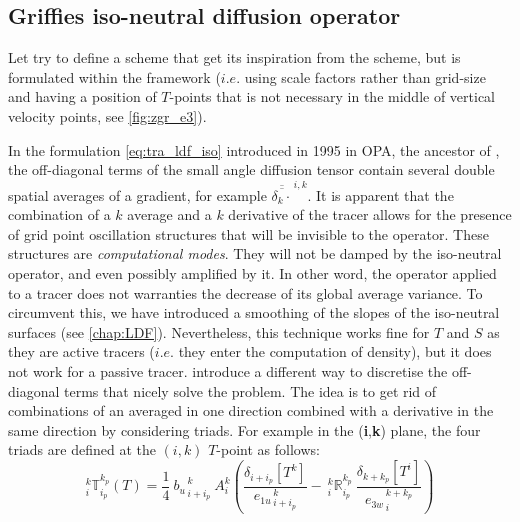 \documentclass[../tex_main/NEMO_manual]{subfiles}
\begin{document}
\subsection{Griffies iso-neutral diffusion operator}

Let try to define a scheme that get its inspiration from the \citet{Griffies_al_JPO98} scheme,
but is formulated within the \NEMO framework
($i.e.$ using scale factors rather than grid-size and having a position of $T$-points that
is not necessary in the middle of vertical velocity points, see \autoref{fig:zgr_e3}).

In the formulation \autoref{eq:tra_ldf_iso} introduced in 1995 in OPA, the ancestor of \NEMO,
the off-diagonal terms of the small angle diffusion tensor contain several double spatial averages of a gradient,
for example $\overline{\overline{\delta_k \cdot}}^{\,i,k}$.
It is apparent that the combination of a $k$ average and a $k$ derivative of the tracer allows for
the presence of grid point oscillation structures that will be invisible to the operator.
These structures are \textit{computational modes}.
They will not be damped by the iso-neutral operator, and even possibly amplified by it.
In other word, the operator applied to a tracer does not warranties the decrease of its global average variance.
To circumvent this, we have introduced a smoothing of the slopes of the iso-neutral surfaces
(see \autoref{chap:LDF}).
Nevertheless, this technique works fine for $T$ and $S$ as they are active tracers
($i.e.$ they enter the computation of density), but it does not work for a passive tracer.
\citep{Griffies_al_JPO98} introduce a different way to discretise the off-diagonal terms that
nicely solve the problem.
The idea is to get rid of combinations of an averaged in one direction combined with
a derivative in the same direction by considering triads.
For example in the (\textbf{i},\textbf{k}) plane, the four triads are defined at the $(i,k)$ $T$-point as follows:
\begin{equation} \label{eq:Gf_triads}
_i^k \mathbb{T}_{i_p}^{k_p} (T)
= \frac{1}{4} \ {b_u}_{\,i+i_p}^{\,k}  \  A_i^k  	\left(  
                                                     \frac{ \delta_{i + i_p}[T^k] }{ {e_{1u}}_{\,i + i_p}^{\,k} } 
-\ {_i^k \mathbb{R}_{i_p}^{k_p}} \ \frac{ \delta_{k+k_p} [T^i] }{ {e_{3w}}_{\,i}^{\,k+k_p} } 
									  \right)
\end{equation}
\end{document}
